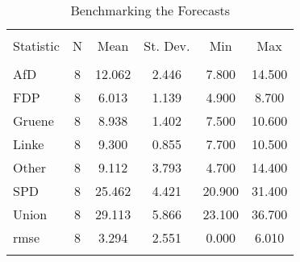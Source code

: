
\begin{table}[!htbp] \centering 
  \caption{Benchmarking the Forecasts} 
  \label{} 
\begin{tabular}{@{\extracolsep{5pt}}lccccc} 
\\[-1.8ex]\hline 
\hline \\[-1.8ex] 
Statistic & \multicolumn{1}{c}{N} & \multicolumn{1}{c}{Mean} & \multicolumn{1}{c}{St. Dev.} & \multicolumn{1}{c}{Min} & \multicolumn{1}{c}{Max} \\ 
\hline \\[-1.8ex] 
AfD & 8 & 12.062 & 2.446 & 7.800 & 14.500 \\ 
FDP & 8 & 6.013 & 1.139 & 4.900 & 8.700 \\ 
Gruene & 8 & 8.938 & 1.402 & 7.500 & 10.600 \\ 
Linke & 8 & 9.300 & 0.855 & 7.700 & 10.500 \\ 
Other & 8 & 9.112 & 3.793 & 4.700 & 14.400 \\ 
SPD & 8 & 25.462 & 4.421 & 20.900 & 31.400 \\ 
Union & 8 & 29.113 & 5.866 & 23.100 & 36.700 \\ 
rmse & 8 & 3.294 & 2.551 & 0.000 & 6.010 \\ 
\hline \\[-1.8ex] 
\end{tabular} 
\end{table} 
